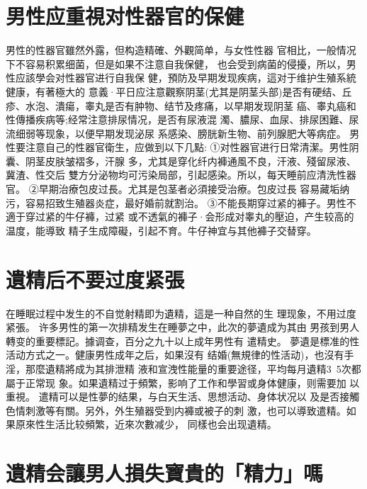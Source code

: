 \documentclass[12pt,UTF8]{ctexbook}
\begin{document}
\section{男性应重視对性器官的保健}

男性的性器官雖然外露，但构造精確、外觀简单，与女性性器
官相比，一般情况下不容易积累细菌，但是如果不注意自我保健，
也会受到病菌的侵擾，所以，男性应該學会对性器官进行自我保
健，預防及早期发现疾病，這对于维护生殖系統健康，有著極大的
意義·平日应注意觀察阴茎(尤其是阴茎头部)是否有硬结、丘
疹、水泡、潰瘍，睾丸是否有肿物、结节及疼痛，以早期发现阴茎
癌、睾丸癌和性傳播疾病等;经常注意排尿情况，是否有尿液混
濁、膿尿、血尿、排尿困難、尿流细弱等现象，以便早期发现泌尿
系感染、膀胱新生物、前列腺肥大等病症。
男性要注意自己的性器官衛生，应做到以下几點:
①对性器官进行日常清潔。男性阴囊、阴茎皮肤皱褶多，汗腺
多，尤其是穿化纤内褲通風不良，汗液、殘留尿液、冀渣、性交后
雙方分泌物均可污染局部，引起感染。所以，每天睡前应清洗性器
官。
②早期治療包皮过長。尤其是包茎者必須接受治療。包皮过長
容易藏垢纳污，容易招致生殖器炎症，最好婚前就割治。
③不能長期穿过紧的褲子。男性不適于穿过紧的牛仔褲，过紧
或不透氣的褲子·会形成对睾丸的壓迫，产生较高的温度，能導致
精子生成障礙，引起不育。牛仔神宜与其他褲子交替穿。

\section{遺精后不要过度紧張}

在睡眠过程中发生的不自觉射精即为遺精，這是一种自然的生
理现象，不用过度紧張。
许多男性的第一次排精发生在睡夢之中，此次的夢遺成为其由
男孩到男人轉变的重要標記。據调查，百分之九十以上成年男性有
遣精史。
夢遺是標准的性活动方式之一。健康男性成年之后，如果沒有
结婚(無規律的性活动)，也沒有手淫，那麼遺精將成为其排泄精
液和宣洩性能量的重要途径，平均每月遺精3~5次都屬于正常现
象。如果遺精过于頻繁，影响了工作和學習或身体健康，则需要加
以重視。
遣精可以是性夢的结果，与白天生活、思想活动、身体状况以
及是否接觸色情刺激等有關。另外，外生殖器受到内褲或被子的刺
激，也可以導致遣精。如果原來性生活比较頻繁，近來次數减少，
同樣也会出现遺精。

\section{遺精会讓男人損失寶貴的「精力」嗎}
\end{document}

